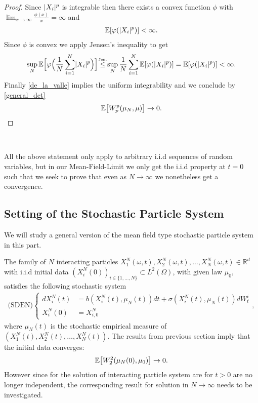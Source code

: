 \begin{proof}
	Since $\lvert X_i\rvert^{p} $ is integrable then there exists a convex function  $\phi $ with $\lim_{x \to \infty} \frac{\phi(x)}{x} = \infty$ and 
	\begin{align*}
	\mathbb{E}[\varphi(\lvert X_i\rvert^{p} )] < \infty
	.\end{align*}
	Since $\phi $ is convex we apply Jensen's inequality to get 
	\begin{align*}
	\sup_N \E\Big[\phi \Big(\frac{1}{N}\sum_{i=1}^{N} \abs{X_i}^{p}\Big) \Big]  \myS{Jen.}{\le } \sup_N \frac1N \sum_{i=1}^{N}\E[\phi (\abs{X_i}^{p} )] =  \E[\phi(\abs{X_i}^{p} )] < \infty
	.\end{align*}
	Finally \autoref{de_la_valle}  implies the uniform integrability and we conclude by \autoref{general_dct}
	\begin{align*}
	\mathbb{E}\big[W_p^{p}(\mu_N,\mu ) \big]\to 0
	.\end{align*}
\end{proof}
\hspace{0mm}\\[1ex]

\begin{remark}
	All the above statement only apply to arbitrary i.i.d sequences of random variables, but in our Mean-Field-Limit we only get 
the i.i.d property at $t=0$ such that we seek to prove that even as $N \to \infty$ we nonetheless get a convergence.
\end{remark}

\newpage
\subsection{Setting of the Stochastic Particle System}
We will study a general version of the mean field type stochastic particle system in this part. 

The family of $N$ interacting particles $X^N_{1}(\omega,t) , X^N_2(\omega,t),\ldots ,X^{N}_N(\omega,t)\in \mathbb{R}^d$ with i.i.d initial data $(X_i^{N}(0))_{i \in  \{1,\ldots ,N\}  } \subset  L^2(\Omega) $, with given law $\mu_0$, satisfies the following stochastic system
	\begin{align}\label{sden}
	\text{(SDEN)}\begin{cases}
	d X_i^{N}(t) &=   b(X_i^{N}(t) , \mu_N(t) )dt + \sigma(X_i^{N}(t),\mu_N(t))dW^{i}_t \\
	X_i^{N}(0) &= X_{i,0}^{N}   
	\end{cases}
	,\end{align}
where $\mu_N(t)$ is the stochastic empirical measure of  $(X^N_{1}(t) , X^N_2(t),\ldots ,X^{N}_N(t) )$.
The results from previous section imply that the initial data converges:
\begin{align*}
\mathbb{E}\big[W_2^{2}(\mu_N(0),\mu_0) \big] \to  0
.\end{align*}
However since for the solution of interacting particle system are for $t>0$ are no longer independent, the corresponding result for solution in $N\rightarrow \infty$ needs to be investigated.


